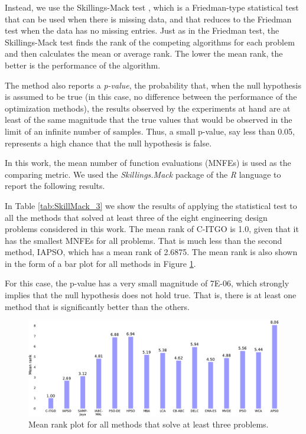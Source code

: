 Instead, we use the Skillings-Mack test \citep{Skillings}, which is a Friedman\allowbreak-type statistical test that can be used when there is missing data, and that reduces to the Friedman test when the data has no missing entries. Just as in the Friedman test, the Skillings-Mack test finds the rank of the competing algorithms for each problem and then calculates the mean or average rank. The lower the mean rank, the better is the performance of the algorithm.

The method also reports a \textit{p-value}, the probability that, when the null hypothesis is assumed to be true (in this case, no difference between the performance of the optimization methods), the results observed by the experiments at hand are at least of the same magnitude that the true values that would be observed in the limit of an infinite number of samples. Thus, a small p-value, say less than 0.05, represents a high chance that the null hypothesis is false.

In this work, the mean number of function evaluations (MNFEs) is used as the comparing metric. We used the \textit{Skillings.Mack} package \citep{SkillMack} of the \textit{R} language \citep{R} to report the following results.

In Table \ref{tab:SkillMack_3} we show the results of applying the statistical test to all the methods that solved at least three of the eight engineering design problems considered in this work. The mean rank of C-ITGO is 1.0, given that it has the smallest MNFEs for all problems. That is much less than the second method, IAPSO, which has a mean rank of 2.6875. The mean rank is also shown in the form of a bar plot for all methods in Figure \ref{fig:SkillMack_3}.





For this case, the p-value has a very small magnitude of 7E-06, which strongly implies that the null hypothesis does not hold true. That is, there is at least one method that is significantly better than the others. 



\begin{figure}[h]
    \begin{center}
    \includegraphics[scale=0.6]{Imgs/SkillMack_3-crop.pdf}
    \end{center}
    \captionsetup{justification=centering}
    \vspace*{-4mm}
    \caption{Mean rank plot for all methods that solve at least three problems.}\label{fig:SkillMack_3}
\end{figure}



